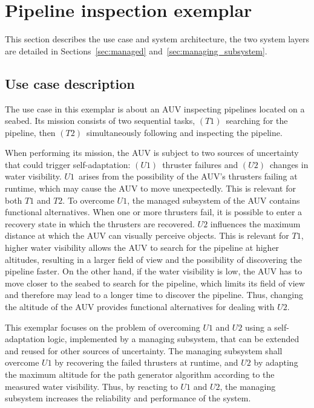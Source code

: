 \section{Pipeline inspection exemplar}\label{sec:problem_statement}
This section describes the use case and system architecture, the two
system layers are detailed in Sections~\ref{sec:managed} and~\ref{sec:managing_subsystem}.

\subsection{Use case description}\label{sec:use_case_description}
The use case in this exemplar is about an AUV inspecting pipelines located on a seabed.
Its mission consists of two sequential tasks, $(T1)$~searching for the pipeline, then $(T2)$~simultaneously following and inspecting the pipeline.


When performing its mission, the AUV is subject to two sources of
uncertainty that could trigger self-adaptation: $(U1)$~thruster
failures and $(U2)$~changes in water visibility. $U1$~arises from the
possibility of the AUV's thrusters failing at runtime, which may cause
the AUV to move unexpectedly. This is relevant for both $T1$ and $T2$. To overcome $U1$, the managed subsystem of the AUV
contains functional alternatives. When
one or more thrusters fail, it is possible to enter a recovery state
in which the thrusters are recovered.
$U2$
influences the maximum distance at which the AUV can visually perceive
objects. This is relevant for $T1$, higher water visibility
allows the AUV to search for the pipeline at higher altitudes,
resulting in a larger field of view and the possibility of discovering the pipeline faster. On the other hand, if the water
visibility is low, the AUV has to move closer to the seabed to
search for the pipeline, which limits its field of view and therefore
may lead to a longer time to discover the pipeline. Thus, changing the
altitude of the AUV provides functional alternatives for dealing with $U2$.

This exemplar focuses on the problem of overcoming $U1$ and $U2$ using
a self-adaptation logic, implemented by a managing subsystem, that
can be extended and reused for other sources of uncertainty.
The managing subsystem shall overcome $U1$ by recovering the failed
thrusters at runtime, and $U2$ by adapting the maximum altitude for
the path generator algorithm according to the measured water
visibility.  Thus, by reacting to $U1$ and $U2$, the managing
subsystem increases the reliability and performance of the system.

